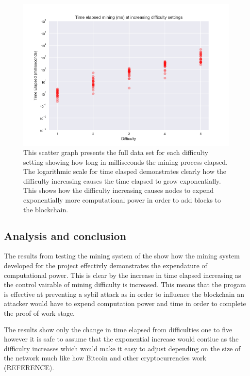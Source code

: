 \documentclass{l4proj}
\begin{document}
\begin{figure}[!ht]
    \centering
    \includegraphics[width=1\linewidth]{images/fulldatascatter.png}    
    \caption
    {
        This scatter graph presents the full data set for each difficulty setting showing how long in milliseconds
        the mining process elapsed. The logarithmic scale for time elasped demonstrates clearly how the difficulty
        increasing causes the time elapsed to grow exponentially. This shows how the difficulty increasing causes
        nodes to expend exponentially more computational power in order to add blocks to the blockchain.
    }
    \label{fig:fulldatascatter} 
\end{figure}

\subsection{Analysis and conclusion}
The results from testing the mining system of the show how the mining system developed for the project effectivly
demonstrates the expendature of computational power. This is clear by the increase in time elapsed increasing as the
control vairable of mining difficulty is increased. This means that the progam is effective at preventing a sybil attack
as in order to influence the blockchain an attacker would have to expend computation power and time in order to complete
the proof of work stage.

The results show only the change in time elapsed from difficulties one to five however it is safe to assume that the
exponential increase would contiue as the difficulty increases which would make it easy to adjust depending on the
size of the network much like how Bitcoin and other cryptocurrencies work (REFERENCE).
\end{document}
